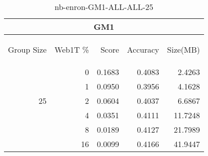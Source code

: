 \begin{center}
\begin{table}[htbp]
\begin{tabular}{ | r | r | r | r | r |}
\hline
\multicolumn{5}{|c|}{GM1}\\
\hline
\begin{sideways}Group Size\end{sideways} & \begin{sideways}Web1T \%\end{sideways} & \begin{sideways}Score\end{sideways} & \begin{sideways}Accuracy\end{sideways} & \begin{sideways}Size(MB)\end{sideways}\\
\hline
\multirow{5}{*}{25}
 & 0 & 0.1683 & 0.4083 & 2.4263\\ \cline{2-5}
 & 1 & 0.0950 & 0.3956 & 4.1628\\ \cline{2-5}
 & 2 & 0.0604 & 0.4037 & 6.6867\\ \cline{2-5}
 & 4 & 0.0351 & 0.4111 & 11.7248\\ \cline{2-5}
 & 8 & 0.0189 & 0.4127 & 21.7989\\ \cline{2-5}
 & 16 & 0.0099 & 0.4166 & 41.9447\\ \cline{2-5}
\hline
\end{tabular}
\caption{nb-enron-GM1-ALL-ALL-25}
\label{table:nb-enron-GM1-ALL-ALL-25}
\end{table}
\end{center}

